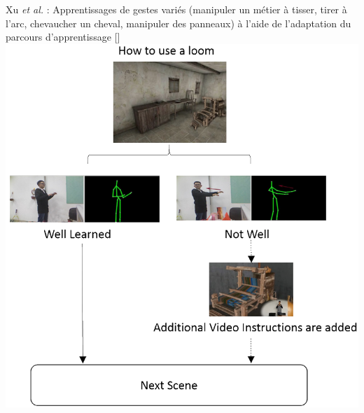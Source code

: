 \documentclass[svgnames]{beamer}
\newcommand{\mycite}[1]{[\textit{\cite{#1}}]}
\begin{document}
	\begin{frame}{\secname}
		 Xu \textit{et al.} : Apprentissages de gestes variés (manipuler un métier à tisser, tirer à l’arc, chevaucher un cheval, manipuler des panneaux) à l'aide de l'adaptation du parcours d'apprentissage \mycite{Xu2019Ptt}\\
		\centering
		\includegraphics[scale=0.3]{img/eiah_xu.png}
	\end{frame}
	
\end{document}
